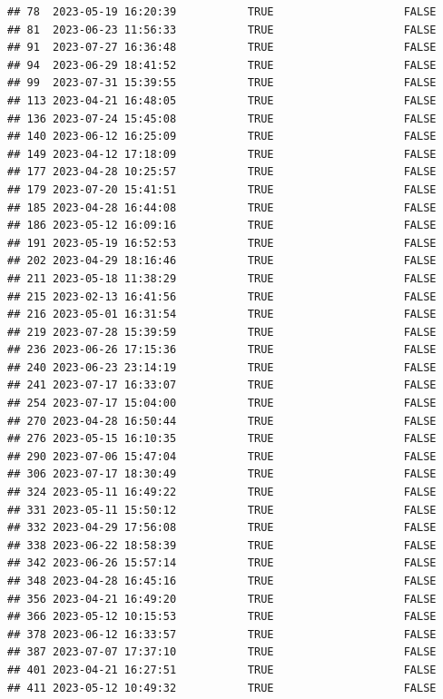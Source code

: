 \documentclass[
]{article}
\begin{document}
\begin{verbatim}
## 78  2023-05-19 16:20:39           TRUE                    FALSE
## 81  2023-06-23 11:56:33           TRUE                    FALSE
## 91  2023-07-27 16:36:48           TRUE                    FALSE
## 94  2023-06-29 18:41:52           TRUE                    FALSE
## 99  2023-07-31 15:39:55           TRUE                    FALSE
## 113 2023-04-21 16:48:05           TRUE                    FALSE
## 136 2023-07-24 15:45:08           TRUE                    FALSE
## 140 2023-06-12 16:25:09           TRUE                    FALSE
## 149 2023-04-12 17:18:09           TRUE                    FALSE
## 177 2023-04-28 10:25:57           TRUE                    FALSE
## 179 2023-07-20 15:41:51           TRUE                    FALSE
## 185 2023-04-28 16:44:08           TRUE                    FALSE
## 186 2023-05-12 16:09:16           TRUE                    FALSE
## 191 2023-05-19 16:52:53           TRUE                    FALSE
## 202 2023-04-29 18:16:46           TRUE                    FALSE
## 211 2023-05-18 11:38:29           TRUE                    FALSE
## 215 2023-02-13 16:41:56           TRUE                    FALSE
## 216 2023-05-01 16:31:54           TRUE                    FALSE
## 219 2023-07-28 15:39:59           TRUE                    FALSE
## 236 2023-06-26 17:15:36           TRUE                    FALSE
## 240 2023-06-23 23:14:19           TRUE                    FALSE
## 241 2023-07-17 16:33:07           TRUE                    FALSE
## 254 2023-07-17 15:04:00           TRUE                    FALSE
## 270 2023-04-28 16:50:44           TRUE                    FALSE
## 276 2023-05-15 16:10:35           TRUE                    FALSE
## 290 2023-07-06 15:47:04           TRUE                    FALSE
## 306 2023-07-17 18:30:49           TRUE                    FALSE
## 324 2023-05-11 16:49:22           TRUE                    FALSE
## 331 2023-05-11 15:50:12           TRUE                    FALSE
## 332 2023-04-29 17:56:08           TRUE                    FALSE
## 338 2023-06-22 18:58:39           TRUE                    FALSE
## 342 2023-06-26 15:57:14           TRUE                    FALSE
## 348 2023-04-28 16:45:16           TRUE                    FALSE
## 356 2023-04-21 16:49:20           TRUE                    FALSE
## 366 2023-05-12 10:15:53           TRUE                    FALSE
## 378 2023-06-12 16:33:57           TRUE                    FALSE
## 387 2023-07-07 17:37:10           TRUE                    FALSE
## 401 2023-04-21 16:27:51           TRUE                    FALSE
## 411 2023-05-12 10:49:32           TRUE                    FALSE

\end{verbatim}
\end{document}
